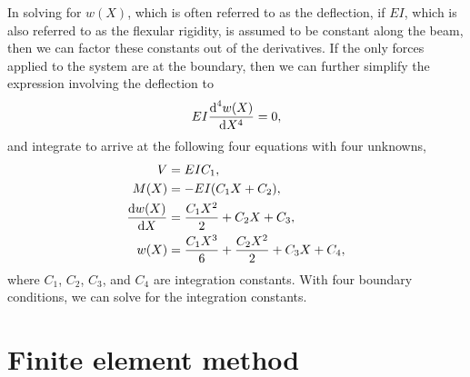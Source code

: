In solving for $w(X)$, which is often referred to as the deflection, if $EI$, which is also referred to as the flexular rigidity, is assumed to be constant along the beam, then we can factor these constants out of the derivatives.
If the only forces applied to the system are at the boundary, then we can further simplify the expression involving the deflection to
\begin{equation}
    EI \frac{\textrm{d}^4 w \mleft( X \mright)}{\textrm{d} X^4} = 0,
\end{equation}
and integrate to arrive at the following four equations with four unknowns,
\begin{align}
    V &= EIC_{1}, \label{eq:shear-force}\\
    M \mleft( X \mright) &= -EI ( C_1 X + C_2 ), \label{eq:moment}\\
    \frac{\textrm{d} w \mleft( X \mright)}{\textrm{d} X} &= \frac{C_1 X^2}{2} + C_2 X + C_3, \label{eq:deflection-slope}\\
    w \mleft( X \mright) &= \frac{C_1 X^3}{6} + \frac{C_2 X^2}{2} + C_3 X + C_4, \label{eq:deflection}
\end{align}
where $C_1$, $C_2$, $C_3$, and $C_4$ are integration constants.
With four boundary conditions, we can solve for the integration constants.

\section*{Finite element method}
\label{sec:finite-element-method}

